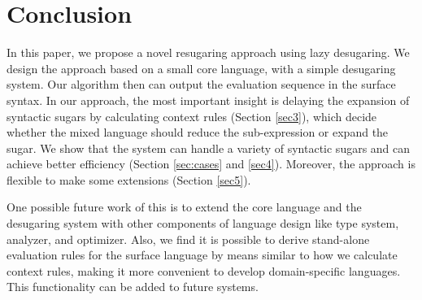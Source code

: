 \section{Conclusion}
\label{sec7}


In this paper, we propose a novel resugaring approach using lazy desugaring. We design the approach based on a small core language, with a simple desugaring system. Our algorithm then can output the evaluation sequence in the surface syntax. In our approach, the most important insight is delaying the expansion of syntactic sugars by calculating context rules (Section \ref{sec3}), which decide whether the mixed language should reduce the sub-expression or expand the sugar. We show that the system can handle a variety of syntactic sugars and can achieve better efficiency (Section \ref{sec:cases} and \ref{sec4}). Moreover, the approach is flexible to make some extensions (Section \ref{sec5}).

One possible future work of this is to extend the core language and the desugaring system with other components of language design like type system, analyzer, and optimizer. Also, we find it is possible to derive stand-alone evaluation rules for the surface language by means similar to how we calculate context rules, making it more convenient to develop domain-specific languages. This functionality can be added to future systems.
